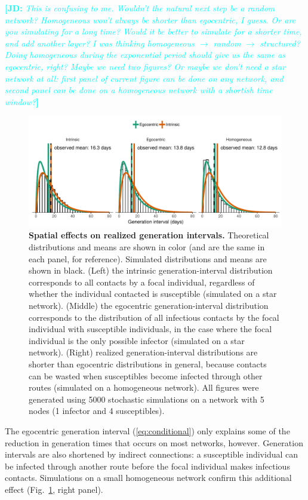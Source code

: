 \documentclass[12pt]{article}
\newcommand{\eref}[1]{(\ref{eq:#1})}
\newcommand{\fref}[1]{Fig.~\ref{fig:#1}}
\newcommand{\comment}[3]{\textcolor{#1}{\textbf{[#2: }\textsl{#3}\textbf{]}}}
\newcommand{\jd}[1]{\comment{cyan}{JD}{#1}}
\begin{document}
\jd{This is confusing to me. Wouldn't the natural next step be a random network? Homogeneous won't always be shorter than egocentric, I guess. Or are you simulating for a long time? Would it be better to simulate for a shorter time, and add another layer? I was thinking homogeneous $\to$ random $\to$ structured? Doing homogeneous during the exponential period should give us the same as egocentric, right? Maybe we need two figures? Or maybe we don't need a star network at all: first panel of current figure can be done on any network, and second panel can be done on a homogeneous network with a shortish time window?} 
\begin{figure}
\includegraphics[width=\textwidth]{../fig/local_effect.pdf}
\caption{
\textbf{Spatial effects on realized generation intervals.}
Theoretical distributions and means are shown in color (and are the same in each panel, for reference). Simulated distributions and means are shown in black.
(Left) the intrinsic generation-interval distribution corresponds to all contacts by a focal individual, regardless of whether the individual contacted is susceptible (simulated on a star network).
(Middle) the egocentric generation-interval distribution corresponds to the distribution of all infectious contacts by the focal individual with susceptible individuals, in the case where the focal individual is the only possible infector (simulated on a star network).
(Right) realized generation-interval distributions are shorter than egocentric distributions in general, because contacts can be wasted when susceptibles become infected through other routes (simulated on a homogeneous network).
All figures were generated using 5000 stochastic simulations on a network with 5 nodes (1 infector and 4 susceptibles).
}
\label{fig:local}
\end{figure}

The egocentric generation interval \eref{conditional} only explains some of the reduction in generation times that occurs on most networks, however.
Generation intervals are also shortened by indirect connections: a susceptible individual can be infected through another route before the focal individual makes infectious contacts.
Simulations on a small homogeneous network confirm this additional effect (\fref{local}, right panel). 
\end{document}
